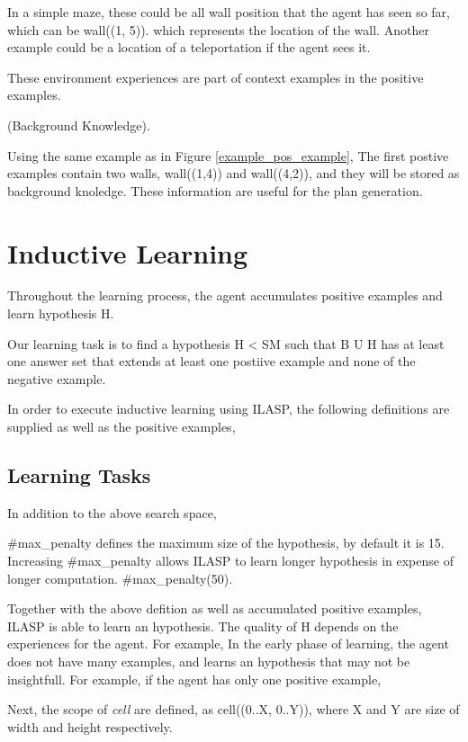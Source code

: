 In a simple maze, these could be all wall position that the agent has seen so far, which can be
wall((1, 5)). which represents the location of the wall.
Another example could be a location of a teleportation if the agent sees it.

These environment experiences are part of context examples in the positive examples.

\begin{examp} \normalfont (Background Knowledge).

Using the same example as in Figure \ref{example_pos_example},
The first postive examples contain two walls, wall((1,4)) and wall((4,2)), and they will be stored as background knoledge. These information are useful for the plan generation.
\end{examp}

\section{Inductive Learning}
\label{induction}
Throughout the learning process, the agent accumulates positive examples and learn hypothesis H.

Our learning task is to find a hypothesis H < SM such that B U H has at least one answer set that extends at least one postiive example and none of the negative example.

In order to execute inductive learning using ILASP, the following definitions are supplied as well as the positive examples,

\subsection{Learning Tasks}
\label{sebsec:learning_tasks}
In addition to the above search space, 

\#max\_penalty defines the maximum size of the hypothesis, by default it is 15.
Increasing \#max\_penalty allows ILASP to learn longer hypothesis in expense of longer computation.
\#max\_penalty(50).

Together with the above defition as well as accumulated positive examples, ILASP is able to learn an hypothesis. The quality of H depends on the experiences for the agent.
For example, In the early phase of learning, the agent does not have many examples, and learns an hypothesis that may not be insightfull.
For example, if the agent has only one positive example,

Next, the scope of \textit{cell} are defined, as cell((0..X, 0..Y)), where X and Y are size of width and height respectively.

